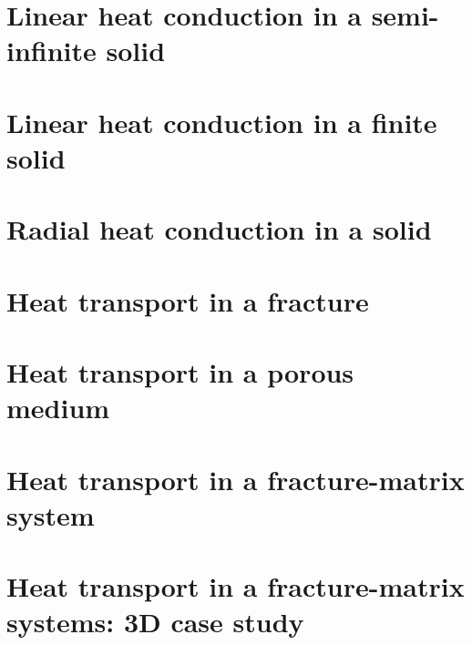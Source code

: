 

\newpage
\section{Linear heat conduction in a semi-infinite solid}
\label{bmt:heat_conduction_infinite}

\section{Linear heat conduction in a finite solid}
\label{bmt:heat_conduction_finite}

\label{bmt:heat_conduction_radial_tbc}
\section{Radial heat conduction in a solid}

\section{Heat transport in a fracture}
\label{bmt:heat_transport_fracture}

\section{Heat transport in a porous medium}
\label{bmt:heat_transport_porous_medium}
 
\newpage
\section{Heat transport in a fracture-matrix system}
\label{bmt:heat_transport_fracture_matrix}

\section{Heat transport in a fracture-matrix systems: 3D case study}
\label{bmt:heat_transport_3D_fracture_matrix}

